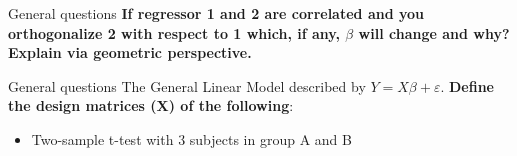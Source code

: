 \documentclass{beamer}
\begin{document}
\begin{frame}{General questions}
  \textbf{If regressor 1 and 2 are correlated and you orthogonalize 2 with respect to 1 which, if any, $\beta$ will change and why? Explain via geometric perspective.}

% 
\end{frame} 

% 
% 


\begin{frame}{General questions}  
  The General Linear Model described by $Y=X\beta+\varepsilon$. \textbf{Define the design matrices (X) of the following}:

  \begin{itemize}
    \item Two-sample t-test with 3 subjects in group A and B
  \end{itemize}

\end{frame}
\end{document}
